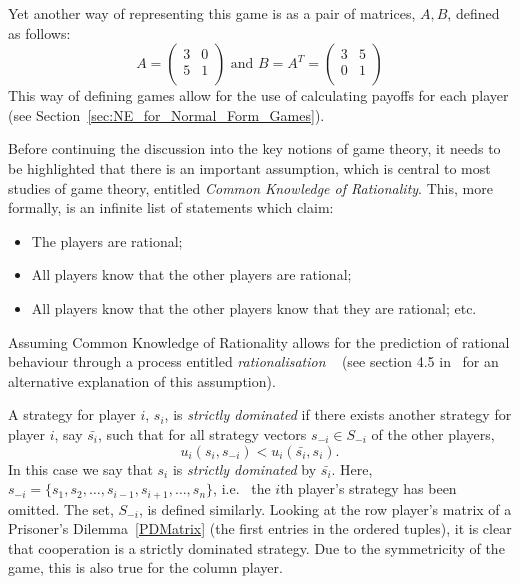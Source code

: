 Yet another way of representing this game is as a pair of matrices, \(A, B\),
defined as follows:
\[
    A = 
    \begin{pmatrix}
       3 & 0\\
       5 & 1\\ 
    \end{pmatrix}
    \text{ and } B = A^{T} =
    \begin{pmatrix}
        3 & 5\\
        0 & 1\\
    \end{pmatrix}
\]
This way of defining games allow for the use of calculating payoffs for each
player (see Section~\ref{sec:NE_for_Normal_Form_Games}).

Before continuing the discussion into the key notions of game theory, it needs
to be highlighted that there is an important assumption, which is central to
most studies of game theory, entitled \textit{Common Knowledge of Rationality}.
This, more formally, is an infinite list of statements which claim:
    \begin{itemize}
        \item The players are rational;
        \item All players know that the other players are rational;
        \item All players know that the other players know that they are 
        rational; etc.    
    \end{itemize}
Assuming Common Knowledge of Rationality allows for the prediction of rational
behaviour through a process entitled \textit{rationalisation}
~\cite{Knight2019}
(see section 4.5 in~\cite{maschler_solan_zamir_2013} for an alternative
explanation of this assumption). 


A strategy for player \(i\), \(s_{i}\), is \textit{strictly dominated} if there
exists another strategy for player \(i\), say \(\bar{s_{i}}\), such that for all
strategy vectors \(s_{-i} \in S_{-i}\) of the other players, 
\[
    u_{i}(s_{i}, s_{-i}) < u_{i}(\bar{s_{i}}, s_{i}).
\]
In this case we say that \(s_{i}\) is \textit{strictly dominated} by
\(\bar{s_{i}}\). Here, 
\(s_{-i} = \{s_{1}, s_{2}, \ldots, s_{i-1}, s_{i+1}, \ldots, s_{n}\} \), i.e. \
the \(i\)th player's strategy has been omitted. The 
set, \(S_{-i}\), is defined similarly. Looking at the row player's matrix of a
Prisoner's Dilemma~\ref{PDMatrix} (the first entries in the ordered tuples), it
is clear that cooperation is a strictly dominated strategy. Due to the
symmetricity of the game, this is also true for the column
player.~\cite{maschler_solan_zamir_2013}



